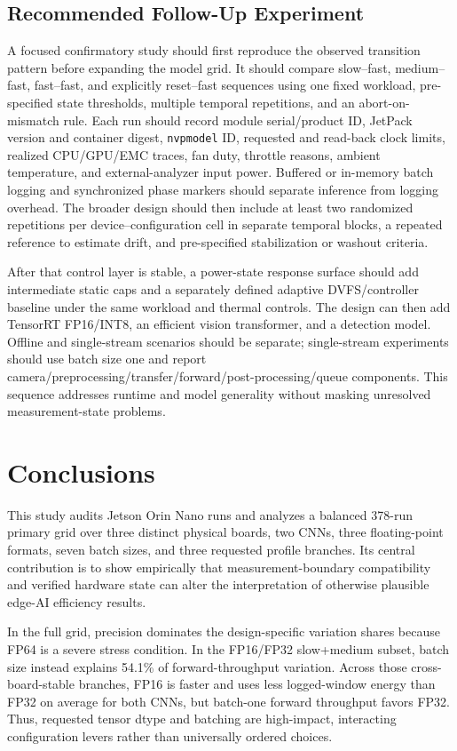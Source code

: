 \documentclass[electronics,article,submit,pdftex,moreauthors]{Definitions/mdpi}
\begin{document}
\subsection{Recommended Follow-Up Experiment}

A focused confirmatory study should first reproduce the observed transition pattern before expanding the model grid. It should compare slow--fast, medium--fast, fast--fast, and explicitly reset--fast sequences using one fixed workload, pre-specified state thresholds, multiple temporal repetitions, and an abort-on-mismatch rule. Each run should record module serial/product ID, JetPack version and container digest, \texttt{nvpmodel} ID, requested and read-back clock limits, realized CPU/GPU/EMC traces, fan duty, throttle reasons, ambient temperature, and external-analyzer input power. Buffered or in-memory batch logging and synchronized phase markers should separate inference from logging overhead. The broader design should then include at least two randomized repetitions per device--configuration cell in separate temporal blocks, a repeated reference to estimate drift, and pre-specified stabilization or washout criteria.

After that control layer is stable, a power-state response surface should add intermediate static caps and a separately defined adaptive DVFS/controller baseline under the same workload and thermal controls. The design can then add TensorRT FP16/INT8, an efficient vision transformer, and a detection model. Offline and single-stream scenarios should be separate; single-stream experiments should use batch size one and report camera/preprocessing/transfer/forward/post-processing/queue components. This sequence addresses runtime and model generality without masking unresolved measurement-state problems.

\section{Conclusions}

This study audits \TotalRuns{} Jetson Orin Nano runs and analyzes a balanced 378-run primary grid over three distinct physical boards, two CNNs, three floating-point formats, seven batch sizes, and three requested profile branches. Its central contribution is to show empirically that measurement-boundary compatibility and verified hardware state can alter the interpretation of otherwise plausible edge-AI efficiency results.

In the full grid, precision dominates the design-specific variation shares because FP64 is a severe stress condition. In the FP16/FP32 slow+medium subset, batch size instead explains 54.1\% of forward-throughput variation. Across those cross-board-stable branches, FP16 is faster and uses less logged-window energy than FP32 on average for both CNNs, but batch-one forward throughput favors FP32. Thus, requested tensor dtype and batching are high-impact, interacting configuration levers rather than universally ordered choices.
\end{document}

